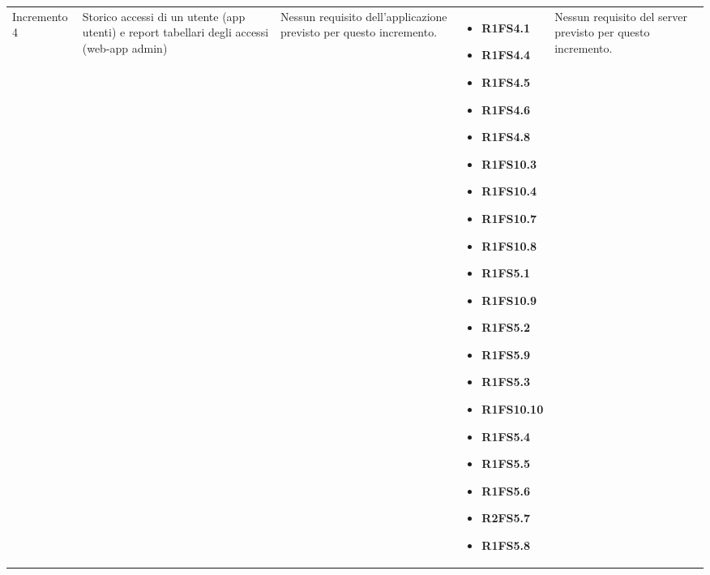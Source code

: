 {\begin{longtable}{C{2.5cm} C{3.2cm} C{2.8cm} C{2.8cm} C{2.8cm}}
Incremento 4 & Storico accessi di un utente (app utenti) e report tabellari degli accessi (web-app admin) &
    Nessun requisito dell'applicazione previsto per questo incremento.
    & \begin{itemize} 
    \item[ ] \textbf{R1FS4.1}
    \item[ ] \textbf{R1FS4.4}
    \item[ ] \textbf{R1FS4.5}
    \item[ ] \textbf{R1FS4.6}
    \item[ ] \textbf{R1FS4.8}
    \item[ ] \textbf{R1FS10.3}
    \item[ ] \textbf{R1FS10.4}
    \item[ ] \textbf{R1FS10.7}
    \item[ ] \textbf{R1FS10.8}
    \item[ ] \textbf{R1FS5.1}
    \item[ ] \textbf{R1FS10.9}
    \item[ ] \textbf{R1FS5.2}
    \item[ ] \textbf{R1FS5.9}
    \item[ ] \textbf{R1FS5.3}
    \item[ ] \textbf{R1FS10.10}
    \item[ ] \textbf{R1FS5.4}
    \item[ ] \textbf{R1FS5.5}
    \item[ ] \textbf{R1FS5.6}
    \item[ ] \textbf{R2FS5.7}
    \item[ ] \textbf{R1FS5.8}
\end{itemize} & 
    Nessun requisito del server previsto per questo incremento. \\


\end{longtable}}
